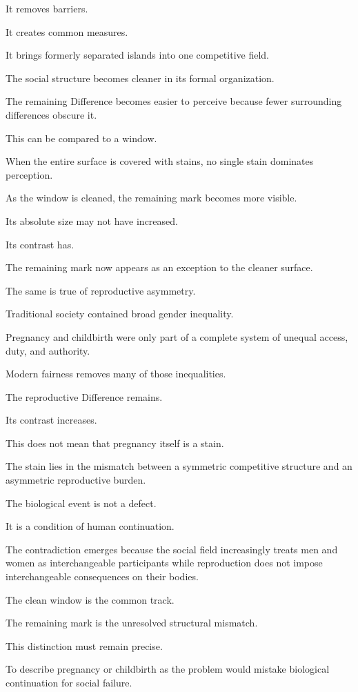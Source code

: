 It removes barriers.

It creates common measures.

It brings formerly separated islands into one competitive field.

The social structure becomes cleaner in its formal organization.

The remaining Difference becomes easier to perceive because fewer surrounding differences obscure it.

This can be compared to a window.

When the entire surface is covered with stains, no single stain dominates perception.

As the window is cleaned, the remaining mark becomes more visible.

Its absolute size may not have increased.

Its contrast has.

The remaining mark now appears as an exception to the cleaner surface.

The same is true of reproductive asymmetry.

Traditional society contained broad gender inequality.

Pregnancy and childbirth were only part of a complete system of unequal access, duty, and authority.

Modern fairness removes many of those inequalities.

The reproductive Difference remains.

Its contrast increases.

This does not mean that pregnancy itself is a stain.

The stain lies in the mismatch between a symmetric competitive structure and an asymmetric reproductive burden.

The biological event is not a defect.

It is a condition of human continuation.

The contradiction emerges because the social field increasingly treats men and women as interchangeable participants while reproduction does not impose interchangeable consequences on their bodies.

The clean window is the common track.

The remaining mark is the unresolved structural mismatch.

This distinction must remain precise.

To describe pregnancy or childbirth as the problem would mistake biological continuation for social failure.


